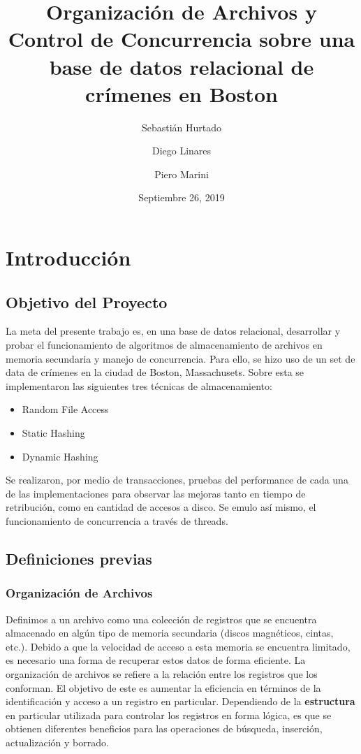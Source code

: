 \documentclass{article}
\title{Organización de Archivos y Control de Concurrencia sobre una base de datos relacional de crímenes en Boston}
\author{Sebastián Hurtado \and Diego Linares \and Piero Marini}
\date{Septiembre 26, 2019}
\begin{document}
  
  \maketitle

  \section{Introducción}
    
    \subsection{Objetivo del Proyecto}
      
      La meta del presente trabajo es, en una base de datos relacional, desarrollar y probar el funcionamiento de algoritmos de almacenamiento de archivos en memoria secundaria y manejo de concurrencia. Para ello, se hizo uso de un set de data de crímenes en la ciudad de Boston, Massachusets. Sobre esta se implementaron las siguientes tres técnicas de almacenamiento:
      \begin{itemize}
        \item Random File Access
        \item Static Hashing
        \item Dynamic Hashing
      \end{itemize}
      Se realizaron, por medio de transacciones, pruebas del performance de cada una de las implementaciones para observar las mejoras tanto en tiempo de retribución, como en cantidad de accesos a disco. Se emulo así mismo, el funcionamiento de concurrencia a través de threads. 
    
    \subsection{Definiciones previas}  
      
      \subsubsection{Organización de Archivos}
      
        Definimos a un archivo como una colección de registros que se encuentra almacenado en algún tipo de memoria secundaria (discos magnéticos, cintas, etc.). Debido a que la velocidad de acceso a esta memoria se encuentra limitado, es necesario una forma de recuperar estos datos de forma eficiente. La organización de archivos se refiere a la relación entre los registros que los conforman. El objetivo de este es aumentar la eficiencia en términos de la identificación y acceso a un registro en particular. Dependiendo de la \textbf{estructura} en particular utilizada para controlar los registros en forma lógica, es que se obtienen diferentes beneficios para las operaciones de búsqueda, inserción, actualización y borrado.
      
\end{document}
